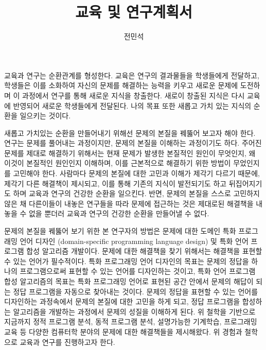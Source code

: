 \documentclass[11pt]{article}
\begin{document}
\title{교육 및 연구계획서}

\author{전민석}



\newcommand{\DisjunctiveModel}{\textsc{Disjunctive Model}}
\newcommand{\FeatureLanguage}{\textsc{Feature Language}}
\newcommand{\GDL}{\textsc{Graph Description Language}}
\newcommand{\PLXGL}{\textsc{PL4XGL}}


\newcommand{\AbstractRelativeWritePattern}{\textsc{Abstract Relative Write Pattern}}





\maketitle 
\begin{spacing}{1.145}

교육과 연구는 순환관계를 형성한다. 
%
교육은 연구의 결과물들을 학생들에게 전달하고, 학생들은 이를 소화하여 자신의 문제를 해결하는 능력을 키우고 새로운 문제에 도전하며 이 과정에서 연구를 통해 새로운 지식을 창출한다. 새로이 창출된 지식은 다시 교육에 반영되어 새로운 학생들에게 전달된다.
%
나의 목표 또한 새롭고 가치 있는 지식의 순환을 일으키는 것이다.



새롭고 가치있는 순환을 만들어내기 위해선 문제의 본질을 꿰뚫어 보고자 해야 한다.
%
연구는 문제를 풀어내는 과정이지만, 문제의 본질을 이해하는 과정이기도 하다. 
%
주어진 문제를 제대로 해결하기 위해서는 현재 문제가 발생한 본질적인 원인이 무엇인지, 왜 이것이 본질적인 원인인지 이해하며, 이를 근본적으로 해결하기 위한 방법이 무었인지를 고민해야 한다.
%
사람마다 문제의 본질에 대한 고민과 이해가 제각기 다르기 때문에, 제각기 다른 해결책이 제시되고, 이를 통해 기존의 지식이 발전되기도 하고 뒤집어지기도 하며 교육과 연구의 건강한 순환을 일으킨다.
%
반면, 문제의 본질을 스스로 고민하지 않은 채 다른이들이 내놓은 연구들을 따라 문제에 접근하는 것은 제대로된 해결책을 내놓을 수 없을 뿐더러 교육과 연구의 건강한 순환을 만들어낼 수 없다.



문제의 본질을 꿰뚫어 보기 위한 본 연구자의 방법은 문제에 대한 도메인 특화 프로그래밍 언어 디자인 (domain-specific programming language design) 및 특화 언어 프로그램 합성 알고리즘 개발이다.
% 
문제에 대한 해결책을 찾기 위해서는 해결책을 표현할 수 있는 언어가 필수적이다.
% 
특화 프로그래밍 언어 디자인의 목표는 문제의 정답을 하나의 프로그램으로써 표현할 수 있는 언어를 디자인하는 것이고, 특화 언어 프로그램 합성 알고리즘의 목표는 특화 프로그래밍 언어로 표현된 공간 안에서 문제의 해답이 되는 정답 프로그램을 자동으로 찾아내는 것이다.
% 
문제의 정답을 표현할 수 있는 언어를 디자인하는 과정속에서 문제의 본질에 대한 고민을 하게 되고, 정답 프로그램을 합성하는 알고리즘을 개발하는 과정에서 문제의 성질을 이해하게 된다.
%
위 철학을 기반으로 지금까지 정적 프로그램 분석, 동적 프로그램 분석, 설명가능한 기계학습, 프로그래밍 교육 등 다양한 컴퓨터학 분야의 문제에 대한 해결책들을 제시해왔다.
%
위 경험과 철학으로 교육과 연구를 진행하고자 한다.








\end{spacing}
\end{document}
